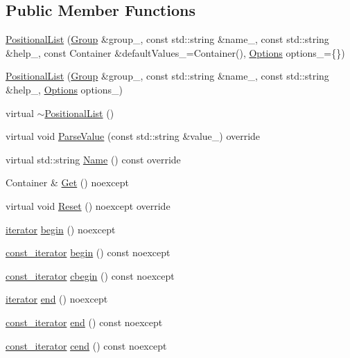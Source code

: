 \subsection*{Public Member Functions}
\begin{DoxyCompactItemize}
\item 
\hyperlink{classargs_1_1_positional_list_ad9b978ced4f1b73cdebda1be5a20c9ae}{Positional\+List} (\hyperlink{classargs_1_1_group}{Group} \&group\+\_\+, const std\+::string \&name\+\_\+, const std\+::string \&help\+\_\+, const Container \&default\+Values\+\_\+=Container(), \hyperlink{namespaceargs_aa530c0f95194aa275f49a5f299ac9e77}{Options} options\+\_\+=\{\})
\item 
\hyperlink{classargs_1_1_positional_list_a81dff6ac754fd0f55dcc39015ddcd1fb}{Positional\+List} (\hyperlink{classargs_1_1_group}{Group} \&group\+\_\+, const std\+::string \&name\+\_\+, const std\+::string \&help\+\_\+, \hyperlink{namespaceargs_aa530c0f95194aa275f49a5f299ac9e77}{Options} options\+\_\+)
\item 
virtual \hyperlink{classargs_1_1_positional_list_a5675c4843b00ca95234e5187dfffacda}{$\sim$\+Positional\+List} ()
\item 
virtual void \hyperlink{classargs_1_1_positional_list_a532d58c777cabe560dfa02674c591245}{Parse\+Value} (const std\+::string \&value\+\_\+) override
\item 
virtual std\+::string \hyperlink{classargs_1_1_positional_list_a5109dbd118c40b6cde570fa37acac950}{Name} () const override
\item 
Container \& \hyperlink{classargs_1_1_positional_list_a9f3c9a6e82c270342bbaedda83b7e9bb}{Get} () noexcept
\item 
virtual void \hyperlink{classargs_1_1_positional_list_ab322681ccb2b97aa10461aba04bd8aba}{Reset} () noexcept override
\item 
\hyperlink{classargs_1_1_positional_list_ad0833c77245d7bc7678de4896d8443da}{iterator} \hyperlink{classargs_1_1_positional_list_a13c58afa1b4313727cc451a7e1d624b8}{begin} () noexcept
\item 
\hyperlink{classargs_1_1_positional_list_a5675a3e27a2a7fc6a7fbd933bd13f3cf}{const\+\_\+iterator} \hyperlink{classargs_1_1_positional_list_a1b743c31dfc824d884ca55569802363f}{begin} () const noexcept
\item 
\hyperlink{classargs_1_1_positional_list_a5675a3e27a2a7fc6a7fbd933bd13f3cf}{const\+\_\+iterator} \hyperlink{classargs_1_1_positional_list_aef5c581f945118e610533e16e139ceeb}{cbegin} () const noexcept
\item 
\hyperlink{classargs_1_1_positional_list_ad0833c77245d7bc7678de4896d8443da}{iterator} \hyperlink{classargs_1_1_positional_list_a5b139259c93d9fd2a315398533fab1b3}{end} () noexcept
\item 
\hyperlink{classargs_1_1_positional_list_a5675a3e27a2a7fc6a7fbd933bd13f3cf}{const\+\_\+iterator} \hyperlink{classargs_1_1_positional_list_ad35ce0d9da38076ab89726c9e45718c8}{end} () const noexcept
\item 
\hyperlink{classargs_1_1_positional_list_a5675a3e27a2a7fc6a7fbd933bd13f3cf}{const\+\_\+iterator} \hyperlink{classargs_1_1_positional_list_a6655c6571a708a936c0b4483dab4210e}{cend} () const noexcept
\end{DoxyCompactItemize}
